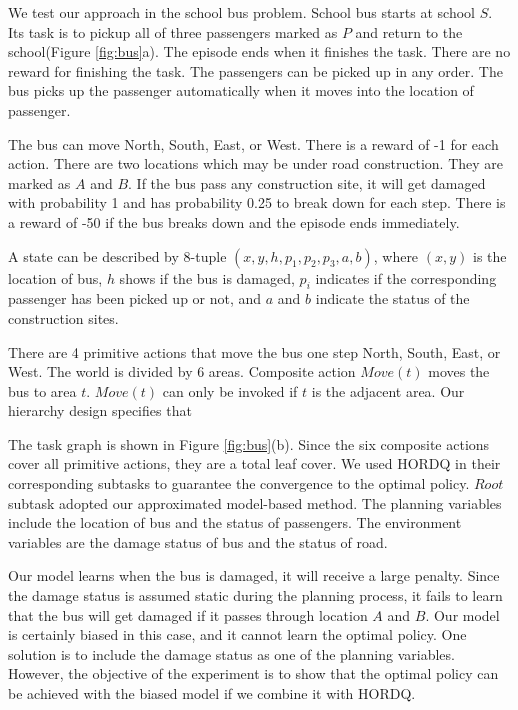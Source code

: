\documentclass{article} %
\begin{document}
We test our approach in the school bus problem. School bus starts at school $S$. Its task 
is to pickup all of three passengers marked as $P$ and return to the school(Figure \ref{fig:bus}a).
The episode ends when it finishes the task. There are no reward for finishing the task.
The passengers can be picked up in any order. The bus picks up the passenger automatically when it moves into
the location of passenger.

The bus can move North, South, East, or West. There is a reward of -1 for each action.
There are two locations which may be under road construction. They are marked as 
$A$ and $B$. If the bus pass any construction site, it will get damaged with probability 1 and has probability
0.25 to break down for each step. There is a reward of -50 if the bus breaks down and the episode ends immediately. 

A state can be described by 8-tuple $(x, y, h, p_1, p_2, p_3, a, b)$, where $(x, y)$ is the location of 
bus, $h$ shows if the bus is damaged, $p_i$ indicates if the corresponding passenger has been picked up or not,
and $a$ and $b$ indicate the status of the construction sites.



There are 4 primitive actions that move the bus one step North, South, East, or West. 
The world is divided by 6 areas. Composite action $Move(t)$ moves the bus to area $t$. 
$Move(t)$ can only be invoked if $t$ is the adjacent area.
Our hierarchy design specifies that

The task graph is shown in Figure \ref{fig:bus}(b). 
Since the six composite actions cover all primitive actions, they are a total leaf cover.
We used HORDQ in their corresponding subtasks to guarantee the convergence to the optimal
policy. $Root$ subtask adopted our approximated model-based method. The planning variables include 
the location of bus and the status of passengers. The environment variables are the 
damage status of bus and the status of road. 

Our model learns when the bus is damaged, it will receive a large penalty.  
Since the damage status is assumed static during the planning process, 
it fails to learn that the bus will get damaged if it passes through
location $A$ and $B$. Our model is certainly biased in this case, and
it cannot learn the optimal policy. One solution is to include the damage 
status as one of the planning variables. However, the objective of 
the experiment is to show that the optimal policy can be achieved
with the biased model if we combine it with HORDQ. 
\end{document}
